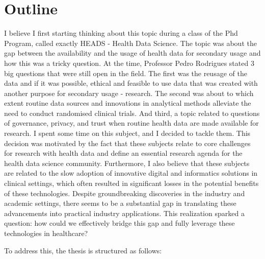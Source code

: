\chapter*{Outline}


I believe I first starting thinking about this topic during a class of the Phd Program, called exactly HEADS - Health Data Science. The topic was about the gap between the availability and the usage of health data for secondary usage and how this was a tricky question. At the time, Professor Pedro Rodrigues stated 3 big questions that were still open in the field. The first was the reusage of the data and if it was possible, ethical and feasible to use data that was created with another purpose for secondary usage -  research. The second was about to which extent routine data sources and innovations in analytical methods alleviate the need to conduct randomised clinical trials. And third, a topic related to questions of governance, privacy, and trust when routine health data are made available for research.
I spent some time on this subject, and I decided to tackle them. This decision was motivated by the fact that these subjects relate to core challenges for research with health data and define an essential research agenda for the health data science community. Furthermore, I also believe that these subjects are related to the slow adoption of innovative digital and informatics solutions in clinical settings, which often resulted in significant losses in the potential benefits of these technologies. Despite groundbreaking discoveries in the industry and academic settings, there seems to be a substantial gap in translating these advancements into practical industry applications. This realization sparked a question: how could we effectively bridge this gap and fully leverage these technologies in healthcare?




To address this, the thesis is structured as follows:\\

